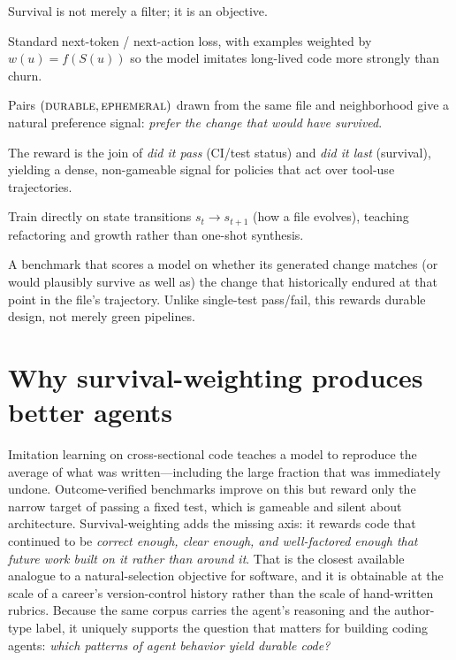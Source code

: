 \documentclass[11pt,letterpaper]{article}
\newcommand{\survival}{\ensuremath{S}}
\begin{document}
Survival is not merely a filter; it is an objective.

\begin{description}[leftmargin=1.2em]
\item[Supervised (durable targets).] Standard next-token / next-action loss,
with examples weighted by $w(u) = f(\survival(u))$ so the model imitates
long-lived code more strongly than churn.
\item[Preference / DPO.] Pairs $(\textsc{durable}, \textsc{ephemeral})$ drawn
from the same file and neighborhood give a natural preference signal:
\emph{prefer the change that would have survived}.
\item[Outcome-verified RL.] The reward is the join of \emph{did it pass}
(CI/test status) and \emph{did it last} (survival), yielding a dense,
non-gameable signal for policies that act over tool-use trajectories.
\item[Trajectory modeling.] Train directly on state transitions
$s_t \to s_{t+1}$ (how a file evolves), teaching refactoring and growth rather
than one-shot synthesis.
\item[Survival-holdout evaluation.] A benchmark that scores a model on whether
its generated change matches (or would plausibly survive as well as) the change
that historically endured at that point in the file's trajectory. Unlike
single-test pass/fail, this rewards durable design, not merely green pipelines.
\end{description}

\section{Why survival-weighting produces better agents}

Imitation learning on cross-sectional code teaches a model to reproduce the
average of what was written---including the large fraction that was immediately
undone. Outcome-verified benchmarks improve on this but reward only the narrow
target of passing a fixed test, which is gameable and silent about architecture.
Survival-weighting adds the missing axis: it rewards code that continued to be
\emph{correct enough, clear enough, and well-factored enough that future work
built on it rather than around it}. That is the closest available analogue to a
natural-selection objective for software, and it is obtainable at the scale of a
career's version-control history rather than the scale of hand-written rubrics.
Because the same corpus carries the agent's reasoning and the author-type label,
it uniquely supports the question that matters for building coding agents:
\emph{which patterns of agent behavior yield durable code?}
\end{document}
